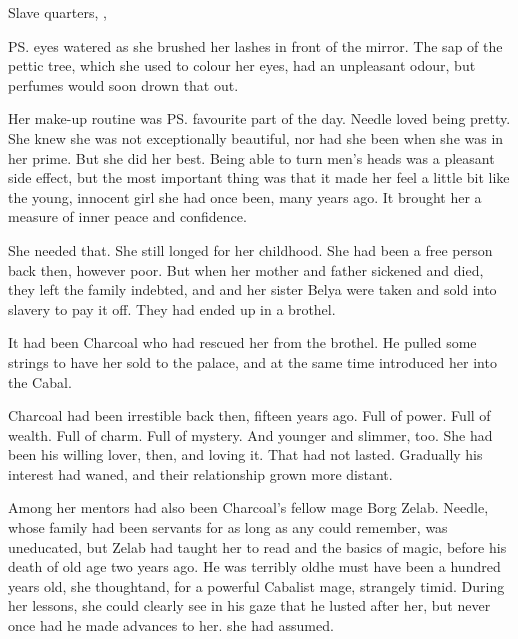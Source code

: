 \stamp
  {\dateAchsahAndNeedle}
  {Slave quarters, \CastlePelidor, }



\begin{comment}
\section{Needle makes herself pretty} 
\end{comment}

\ps{\Piacet}{} eyes watered as she brushed her lashes in front of the mirror. 
The sap of the pettic tree, which she used to colour her eyes, had an unpleasant odour, but perfumes would soon drown that out. 

Her make-up routine was \ps{\Piacet}{} favourite part of the day. 
Needle loved being pretty. 
She knew she was not exceptionally beautiful, nor had she been when she was in her prime. 
But she did her best. 
Being able to turn men's heads was a pleasant side effect, but the most important thing was that it made her feel a little bit like the young, innocent girl she had once been, many years ago. 
It brought her a measure of inner peace and confidence. 

She needed that. 
She still longed for her childhood. 
She had been a free person back then, however poor. 
But when her mother and father sickened and died, they left the family indebted, and \Piacet{} and her sister Belya were taken and sold into slavery to pay it off. 
They had ended up in a brothel. 

It had been Charcoal who had rescued her from the brothel. 
He pulled some strings to have her sold to the palace, and at the same time introduced her into the Cabal. 

Charcoal had been irrestible back then, fifteen years ago. 
Full of power. 
Full of wealth. 
Full of charm. 
Full of mystery. 
And younger and slimmer, too. 
She had been his willing lover, then, and loving it. 
That had not lasted. 
Gradually his interest had waned, and their relationship grown more distant. 

Among her mentors had also been Charcoal's fellow \ishrah{} mage Borg Zelab. 
Needle, whose family had been servants for as long as any could remember, was uneducated, but \Mr{} Zelab had taught her to read and the basics of magic, before his death of old age two years ago. 
He was terribly old\dash he must have been a hundred years old, she thought\dash and, for a powerful Cabalist mage, strangely timid. 
During her lessons, she could clearly see in his gaze that he lusted after her, but never once had he made advances to her. 
 she had assumed. 



